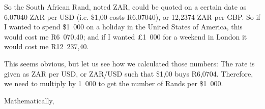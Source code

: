         \label{m39335*id66888}So the South African Rand, noted ZAR, could be quoted on a certain date as 6,07040 ZAR per USD (i.e. \$1,00 costs R6,07040), or 12,2374 ZAR per GBP. So if I wanted to spend \$1~000 on a holiday in the United States of America, this would cost me R6~070,40; and if I wanted £1~000 for a weekend in London it would cost me R12~237,40.\par 
        \label{m39335*id66897}This seems obvious, but let us see how we calculated those numbers:
The rate is given as ZAR per USD, or ZAR/USD such that \$1,00 buys R6,0704. Therefore, we need to multiply by 1~000 to get the number of Rands per \$1~000.\par 
        \label{m39335*id66904}Mathematically,\par 
        \label{m39335*id66909}\nopagebreak\noindent{}
